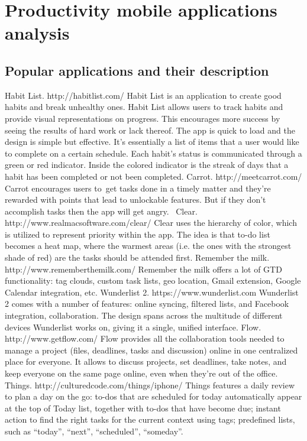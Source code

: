 \chapter{Productivity mobile applications analysis}



\section{Popular applications and their description}

Habit List. http://habitlist.com/ Habit List is an application to create good habits and break unhealthy ones. Habit List allows users to track habits and provide visual representations on progress. This encourages more success by seeing the results of hard work or lack thereof. The app is quick to load and the design is simple but effective. It’s essentially a list of items that a user would like to complete on a certain schedule. Each habit’s status is communicated through a green or red indicator. Inside the colored indicator is the streak of days that a habit has been completed or not been completed.
Carrot. http://meetcarrot.com/ Carrot encourages users to get tasks done in a timely matter and they're rewarded with points that lead to unlockable features. But if they don't accomplish tasks then the app will get angry. 
Clear. http://www.realmacsoftware.com/clear/ Clear uses the hierarchy of color, which is utilized to represent priority within the app. The idea is that to-do list becomes a heat map, where the warmest areas (i.e. the ones with the strongest shade of red) are the tasks should be attended first.
Remember the milk. http://www.rememberthemilk.com/ Remember the milk offers a lot of GTD functionality: tag clouds, custom task lists, geo location, Gmail extension, Google Calendar integration, etc.
Wunderlist 2. https://www.wunderlist.com Wunderlist 2 comes with a number of features: online syncing, filtered lists, and Facebook integration, collaboration. The design spans across the multitude of different devices Wunderlist works on, giving it a single, unified interface.
Flow. http://www.getflow.com/ Flow provides all the collaboration tools needed to manage a project (files, deadlines, tasks and discussion) online in one centralized place for everyone. It allows to discuss projects, set deadlines, take notes, and keep everyone on the same page online, even when they’re out of the office.
Things. http://culturedcode.com/things/iphone/ Things features a daily review to plan a day on the go: to-dos that are scheduled for today automatically appear at the top of Today list, together with to-dos that have become due; instant action to find the right tasks for the current context using tags; predefined lists, such as “today”, “next”, “scheduled”, “someday”.


